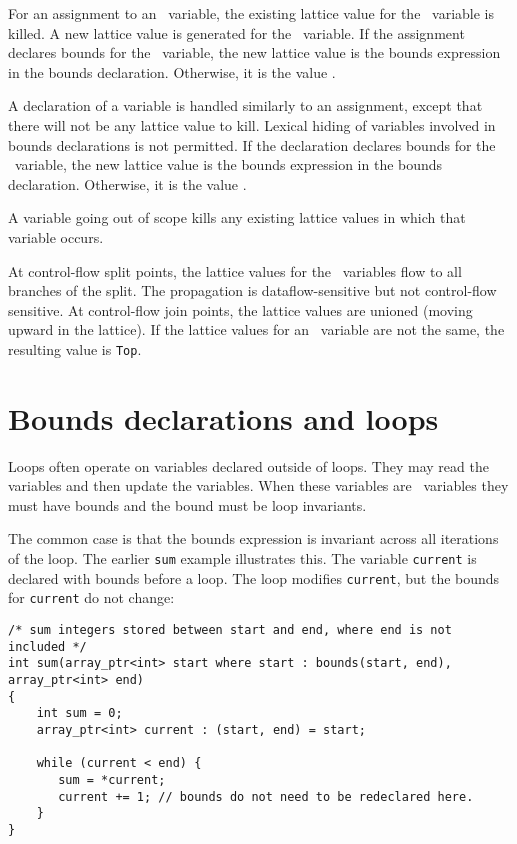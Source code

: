 For an assignment to an \arrayptr\ variable, the existing
lattice value for the \arrayptr\ variable is killed. A new
lattice value is generated for the \arrayptr\ variable. If the
assignment declares bounds for the \arrayptr\ variable, the new
lattice value is the bounds expression in the bounds declaration.
Otherwise, it is the value \boundsnone.

A declaration of a variable is handled similarly to an assignment,
except that there will not be any lattice value to kill. Lexical hiding
of variables involved in bounds declarations is not permitted. If the
declaration declares bounds for the \arrayptr\ variable, the
new lattice value is the bounds expression in the bounds declaration.
Otherwise, it is the value \boundsnone.

A variable going out of scope kills any existing lattice values in which
that variable occurs.

At control-flow split points, the lattice values for the
\arrayptr\ variables flow to all branches of the split. The
propagation is dataflow-sensitive but not control-flow sensitive. At
control-flow join points, the lattice values are unioned (moving upward
in the lattice). If the lattice values for an \arrayptr\
variable are not the same, the resulting value is \texttt{Top}.

\section{Bounds declarations and loops}

Loops often operate on variables declared outside of loops. They may
read the variables and then update the variables. When these variables
are \arrayptr\ variables they must have bounds and the bound
must be loop invariants.

The common case is that the bounds expression is invariant across all
iterations of the loop. The earlier \texttt{sum} example illustrates
this. The variable \texttt{current} is declared with bounds before a
loop. The loop modifies \texttt{current}, but the bounds for
\texttt{current} do not change:

\begin{verbatim}
/* sum integers stored between start and end, where end is not included */
int sum(array_ptr<int> start where start : bounds(start, end), array_ptr<int> end)
{ 
    int sum = 0;
    array_ptr<int> current : (start, end) = start;

    while (current < end) {
       sum = *current;
       current += 1; // bounds do not need to be redeclared here.
    }
}
\end{verbatim}


